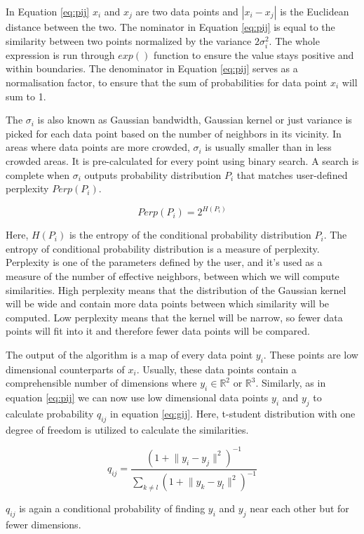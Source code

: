 In Equation \ref{eq:pij} $x_i$ and $x_j$ are two data points and $|x_i - x_j|$ is the Euclidean distance between the two.
The nominator in Equation \ref{eq:pij} is equal to the similarity between two points normalized by the variance $2\sigma_i^2$.
The whole expression is run through $exp()$ function to ensure the value stays positive and within boundaries.
The denominator in Equation \ref{eq:pij} serves as a normalisation factor, to ensure that the sum of probabilities for data point $x_i$ will sum to 1.

The $\sigma_i$ is also known as Gaussian bandwidth, Gaussian kernel or just variance is picked for each data point based on the number of neighbors in its vicinity.
In areas where data points are more crowded, $\sigma_i$ is usually smaller than in less crowded areas.
It is pre-calculated for every point using binary search. 
A search is complete when $\sigma_i$ outputs probability distribution $P_i$ that matches user-defined perplexity $Perp(P_i)$.

$$Perp(P_i) = 2^{H(P_i)}$$

Here, $H(P_i)$ is the entropy of the conditional probability distribution $P_i$.
The entropy of conditional probability distribution is a measure of perplexity.
Perplexity is one of the parameters defined by the user, and it's used as a measure of the number of effective neighbors, between which we will compute similarities.
High perplexity means that the distribution of the Gaussian kernel will be wide and contain more data points between which similarity will be computed.
Low perplexity means that the kernel will be narrow, so fewer data points will fit into it and therefore fewer data points will be compared.

The output of the algorithm is a map of every data point $y_i$.
These points are low dimensional counterparts of $x_i$.
Usually, these data points contain a comprehensible number of dimensions where $y_i \in \mathbb{R}^2$ or $\mathbb{R}^3$. 
Similarly, as in equation \ref{eq:pij} we can now use low dimensional data points $y_i$ and $y_j$ to calculate probability $q_{ij}$ in equation \ref{eq:gij}.
Here, t-student distribution with one degree of freedom is utilized to calculate the similarities.

\begin{equation}
\label{eq:gij}
q_{ij} = \frac{(1+\lVert y_i - y_j \rVert^2)^{-1}}{\sum_{k \neq l} (1+\lVert y_k - y_l \rVert^2)^{-1}} 
\end{equation}

$q_{ij}$ is again a conditional probability of finding $y_i$ and $y_j$ near each other but for fewer dimensions.

